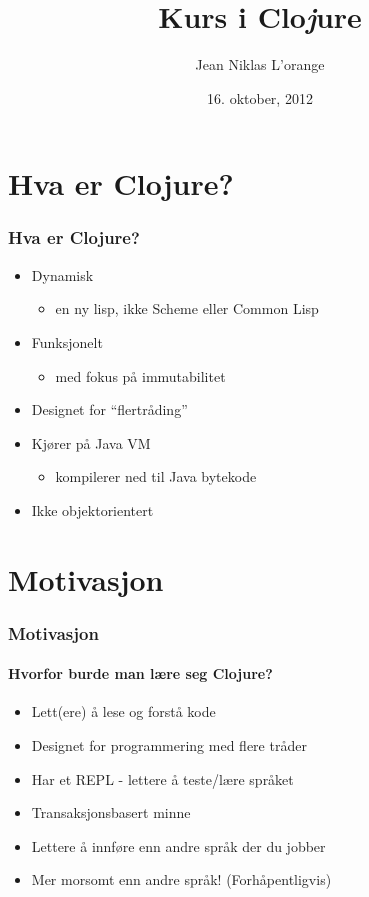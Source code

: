 \documentclass{beamer}
\title[Introduksjonskurs til programmeringsspråket Clo{\em j}ure]{Kurs i Clo{\em j}ure}
\author{Jean Niklas L'orange}
\institute{\texttt{jeannikl@hypirion.com}}
\date{16. oktober, 2012}
\begin{document}
\begin{frame}
  \titlepage
\end{frame}

\section{Hva er Clojure?}

\begin{frame}
  \frametitle{Hva er Clojure?}
  \begin{itemize}
  \item<1-> Dynamisk
    \begin{itemize}
      \item<2-> en ny lisp, ikke Scheme eller Common Lisp
    \end{itemize}
  \item<3-> Funksjonelt
    \begin{itemize}
      \item<4-> med fokus på immutabilitet
    \end{itemize}
  \item<5-> Designet for ``flertråding''
  \item<6-> Kjører på Java VM
    \begin{itemize}
      \item<7-> kompilerer ned til Java bytekode
    \end{itemize}
  \item<8-> Ikke objektorientert 
  \end{itemize}
\end{frame}

\section{Motivasjon}

\begin{frame}
  \frametitle{Motivasjon}
  \framesubtitle{Hvorfor burde man lære seg Clojure?}
  \begin{itemize}
    \item<1-> Lett(ere) å lese og forstå kode
    \item<2-> Designet for programmering med flere tråder
    \item<3-> Har et REPL - lettere å teste/lære språket
    \item<4-> Transaksjonsbasert minne
    \item<5-> Lettere å innføre enn andre språk der du jobber
    \item<6-> Mer morsomt enn andre språk! (Forhåpentligvis)
  \end{itemize}
\end{frame}
\end{document}
